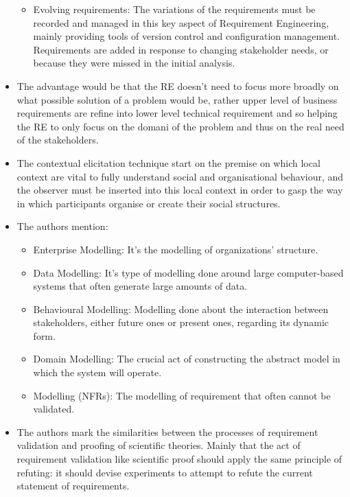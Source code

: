 \begin{itemize}
\begin{itemize}
		\item Evolving requirements: The variations of the requirements must be recorded and managed in this key aspect of Requirement Engineering, mainly providing tools of version control and configuration management. Requirements are added in response to changing stakeholder needs, or because they were missed in the initial analysis.
	\end{itemize}
	\item The advantage would be that the RE doesn't need to focus more broadly on what possible solution of a problem would be, rather upper level of business requirements are refine into lower level technical requirement and so helping the RE to only focus on the domani of the problem and thus on the real need of the stakeholders.
	\item The contextual elicitation technique start on the premise on which local context are vital to fully understand social and organisational behaviour, and the observer must be inserted into this local context in order to gasp the way in which participants organise or create their social structures.
	\item The authors mention:
	\begin{itemize}
		\item Enterprise Modelling: It's the modelling of organizations' structure. 
		\item Data Modelling: It's type of modelling done around large computer-based systems that often generate large amounts of data.
		\item Behavioural Modelling: Modelling done about the interaction between stakeholders, either future ones or present ones, regarding its dynamic form.
		\item Domain Modelling: The crucial act of constructing the abstract model in which the system will operate.
		\item Modelling (NFRs): The modelling of requirement that often cannot be validated.
	\end{itemize}
	\item The authors mark the similarities between the processes of requirement validation and proofing of scientific theories. Mainly that the act of requirement validation like scientific  proof should apply the same principle of refuting: it should devise experiments to attempt to refute the current statement of requirements.
	\end{itemize}
